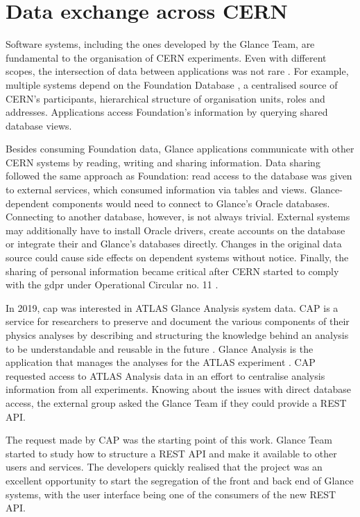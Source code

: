 \section{Data exchange across CERN}

Software systems, including the ones developed by the Glance Team, are fundamental to the organisation of CERN experiments. Even with different scopes, the intersection of data between applications was not rare \cite{de-jesus-tcc}. For example, multiple systems depend on the Foundation Database \cite{foundation-website}, a centralised source of CERN's participants, hierarchical structure of organisation units, roles and addresses. Applications access Foundation's information by querying shared database views.

Besides consuming Foundation data, Glance applications communicate with other CERN systems by reading, writing and sharing information. Data sharing followed the same approach as Foundation: read access to the database was given to external services, which consumed information via tables and views. Glance-dependent components would need to connect to Glance's Oracle databases. Connecting to another database, however, is not always trivial. External systems may additionally have to install Oracle drivers, create accounts on the database or integrate their and Glance's databases directly. Changes in the original data source could cause side effects on dependent systems without notice. Finally, the sharing of personal information became critical after CERN started to comply with the \acrfull{gdpr} \cite{gdpr} under Operational Circular no. 11 \cite{cern-operational-circular-11}.

In 2019, \acrfull{cap} was interested in ATLAS Glance Analysis system data. CAP is a service for researchers to preserve and document the various components of their physics analyses by describing and structuring the knowledge behind an analysis to be understandable and reusable in the future \cite{cap-website}. Glance Analysis is the application that manages the analyses for the ATLAS experiment \cite{atlas-glance-analysis} \cite{pinhao-tcc}. CAP requested access to ATLAS Analysis data in an effort to centralise analysis information from all experiments. Knowing about the issues with direct database access, the external group asked the Glance Team if they could provide a REST API.

The request made by CAP was the starting point of this work. Glance Team started to study how to structure a REST API and make it available to other users and services. The developers quickly realised that the project was an excellent opportunity to start the segregation of the front and back end of Glance systems, with the user interface being one of the consumers of the new REST API.

